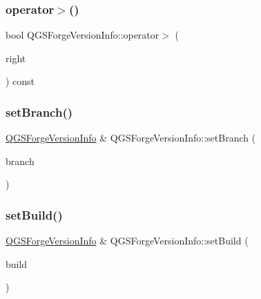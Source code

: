 \mbox{\label{class_q_g_s_forge_version_info_af5d8b833c123e5e830bf8e57331b00cf}} 
\subsubsection{\texorpdfstring{operator$>$()}{operator>()}}
{\footnotesize\ttfamily bool Q\+G\+S\+Forge\+Version\+Info\+::operator$>$ (\begin{DoxyParamCaption}\item[{const \mbox{\hyperlink{class_q_g_s_forge_version_info}{Q\+G\+S\+Forge\+Version\+Info}} \&}]{right }\end{DoxyParamCaption}) const}

\mbox{\label{class_q_g_s_forge_version_info_aeb027060712e1cffa73a583e8a0845aa}} 
\subsubsection{\texorpdfstring{set\+Branch()}{setBranch()}}
{\footnotesize\ttfamily \mbox{\hyperlink{class_q_g_s_forge_version_info}{Q\+G\+S\+Forge\+Version\+Info}} \& Q\+G\+S\+Forge\+Version\+Info\+::set\+Branch (\begin{DoxyParamCaption}\item[{const Q\+String \&}]{branch }\end{DoxyParamCaption})}

\mbox{\label{class_q_g_s_forge_version_info_a3d20aa78a31bb0afab8875759abb5586}} 
\subsubsection{\texorpdfstring{set\+Build()}{setBuild()}}
{\footnotesize\ttfamily \mbox{\hyperlink{class_q_g_s_forge_version_info}{Q\+G\+S\+Forge\+Version\+Info}} \& Q\+G\+S\+Forge\+Version\+Info\+::set\+Build (\begin{DoxyParamCaption}\item[{const int}]{build }\end{DoxyParamCaption})}


